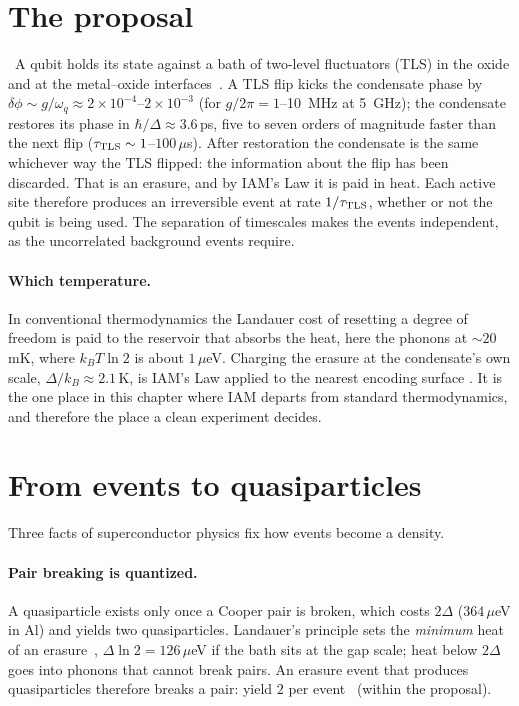 \section{The proposal}
\conjecture\ A qubit holds its state against a bath of two-level fluctuators (TLS) in the oxide and at the metal--oxide interfaces~\cite{Phillips1987,Muller2019}. A TLS flip kicks the condensate
phase by $\delta\phi\sim g/\omega_q\approx2\times10^{-4}$--$2\times10^{-3}$ (for $g/2\pi=1$--10~MHz at 5~GHz); the condensate restores its phase in $\hbar/\Delta\approx3.6$\,ps, five to seven orders of magnitude faster than
the next flip ($\tau_{\rm TLS}\sim1$--$100\,\mu$s). After restoration the condensate is the same whichever way the TLS flipped: the information about
the flip has been discarded. That is an erasure, and by IAM's Law it is paid in heat. Each active site therefore produces an irreversible event at rate
$1/\tau_{\rm TLS}$, whether or not the qubit is being used. The separation of timescales makes the events independent, as the uncorrelated background
events require.
\paragraph{Which temperature.} In conventional thermodynamics the Landauer cost of resetting a degree of freedom is paid to the reservoir that
absorbs the heat, here the phonons at $\sim20$\,mK, where $k_BT\ln2$ is about $1\,\mu$eV. Charging the erasure at the condensate's own scale,
$\Delta/k_B\approx2.1$\,K, is IAM's Law applied to the nearest encoding surface \conjecture. It is the one place in this chapter where IAM departs from standard
thermodynamics, and therefore the place a clean experiment decides.

\section{From events to quasiparticles}
Three facts of superconductor physics fix how events become a density.
\paragraph{Pair breaking is quantized.} A quasiparticle exists only once a Cooper pair is broken, which costs $2\Delta$ ($364\,\mu$eV in Al) and yields
two quasiparticles. Landauer's principle sets the \emph{minimum} heat of an erasure~\cite{Landauer1961}, $\Delta\ln2=126\,\mu$eV if the bath sits at the gap scale;
heat below $2\Delta$ goes into phonons that cannot break pairs. An erasure event that produces quasiparticles therefore breaks a pair: yield $2$ per
event \derived\ (within the proposal).
